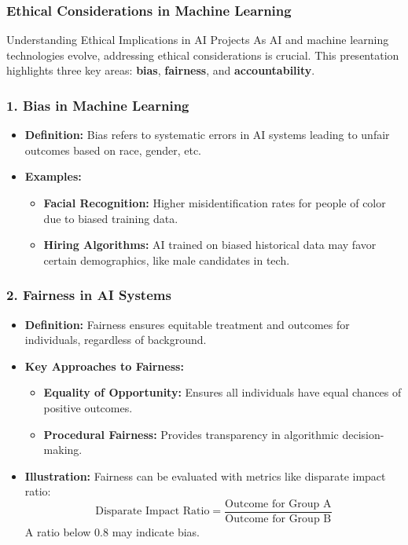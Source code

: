 \documentclass{beamer}
\begin{document}
\begin{frame}[fragile]
    \frametitle{Ethical Considerations in Machine Learning}
    \begin{block}{Understanding Ethical Implications in AI Projects}
        As AI and machine learning technologies evolve, addressing ethical considerations is crucial. 
        This presentation highlights three key areas: \textbf{bias}, \textbf{fairness}, and \textbf{accountability}.
    \end{block}
\end{frame}

\begin{frame}[fragile]
    \frametitle{1. Bias in Machine Learning}
    \begin{itemize}
        \item \textbf{Definition:} 
        Bias refers to systematic errors in AI systems leading to unfair outcomes based on race, gender, etc.
        
        \item \textbf{Examples:}
        \begin{itemize}
            \item \textbf{Facial Recognition:} Higher misidentification rates for people of color due to biased training data.
            \item \textbf{Hiring Algorithms:} AI trained on biased historical data may favor certain demographics, like male candidates in tech.
        \end{itemize}
    \end{itemize}
\end{frame}

\begin{frame}[fragile]
    \frametitle{2. Fairness in AI Systems}
    \begin{itemize}
        \item \textbf{Definition:} 
        Fairness ensures equitable treatment and outcomes for individuals, regardless of background.
        
        \item \textbf{Key Approaches to Fairness:}
        \begin{itemize}
            \item \textbf{Equality of Opportunity:} Ensures all individuals have equal chances of positive outcomes.
            \item \textbf{Procedural Fairness:} Provides transparency in algorithmic decision-making.
        \end{itemize}
        
        \item \textbf{Illustration:} Fairness can be evaluated with metrics like disparate impact ratio:
        \begin{equation}
            \text{Disparate Impact Ratio} = \frac{\text{Outcome for Group A}}{\text{Outcome for Group B}}
        \end{equation}
        A ratio below 0.8 may indicate bias.
    \end{itemize}
\end{frame}
\end{document}
